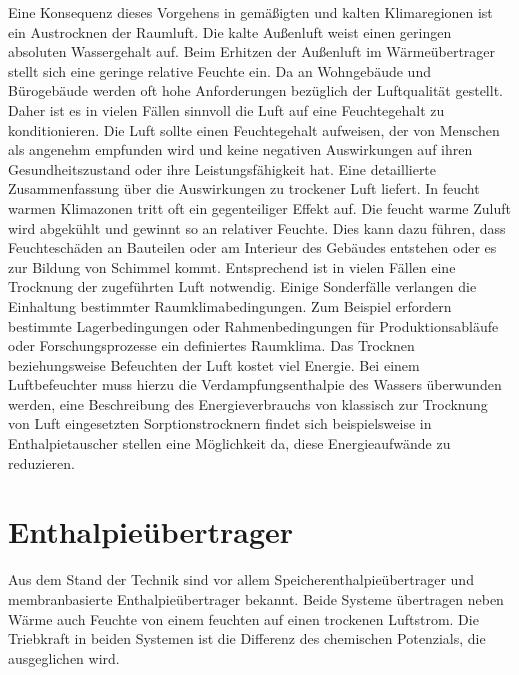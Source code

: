 \begin{normalsize}
\begin{LARGE}
Eine Konsequenz dieses Vorgehens in gemäßigten und kalten Klimaregionen ist ein Austrocknen der Raumluft. Die kalte Außenluft weist einen geringen absoluten Wassergehalt auf. Beim Erhitzen der Außenluft im Wärmeübertrager stellt sich eine geringe relative Feuchte ein. 
Da an Wohngebäude und Bürogebäude werden oft hohe Anforderungen bezüglich der Luftqualität gestellt. Daher ist es in vielen Fällen sinnvoll die Luft auf eine Feuchtegehalt zu konditionieren. Die Luft sollte einen Feuchtegehalt aufweisen, der von Menschen als angenehm empfunden wird und keine negativen Auswirkungen auf ihren Gesundheitszustand oder ihre Leistungsfähigkeit hat. Eine detaillierte Zusammenfassung über die Auswirkungen zu trockener Luft liefert.\cite{JurgenSchniedersDr.RainerPflugerDr.WolfgangFeist.Oktober}
In feucht warmen Klimazonen tritt oft ein gegenteiliger Effekt auf. Die feucht warme Zuluft wird abgekühlt und gewinnt so an relativer Feuchte. Dies kann dazu führen, dass Feuchteschäden an Bauteilen oder am Interieur des Gebäudes entstehen oder es zur Bildung von Schimmel kommt. Entsprechend ist in vielen Fällen eine Trocknung der zugeführten Luft notwendig. \cite{Zhang.2010}
Einige Sonderfälle verlangen die Einhaltung bestimmter Raumklimabedingungen. Zum Beispiel erfordern bestimmte Lagerbedingungen oder Rahmenbedingungen für Produktionsabläufe oder Forschungsprozesse ein definiertes Raumklima. 
Das Trocknen beziehungsweise Befeuchten der Luft kostet viel Energie. Bei einem Luftbefeuchter muss hierzu die Verdampfungsenthalpie des Wassers überwunden werden, eine Beschreibung des Energieverbrauchs von klassisch zur Trocknung von Luft eingesetzten Sorptionstrocknern findet sich beispielsweise in %
Enthalpietauscher stellen eine Möglichkeit da, diese Energieaufwände zu reduzieren. 

\section{Enthalpieübertrager}
\label{Enthalpieübertrager}

Aus dem Stand der Technik sind vor allem Speicherenthalpieübertrager und membranbasierte Enthalpieübertrager bekannt. Beide Systeme übertragen neben Wärme auch Feuchte von einem feuchten auf einen trockenen Luftstrom. Die Triebkraft in beiden Systemen ist die Differenz des chemischen Potenzials, die ausgeglichen wird. 


\end{LARGE}
\end{normalsize}

